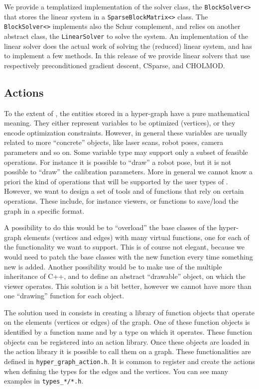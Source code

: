 \documentclass[a4paper]{article}
\begin{document}
We provide a templatized implementation of the solver class, the
\verb+BlockSolver<>+ that stores the linear system in a
\verb+SparseBlockMatrix<>+ class. The \verb+BlockSolver<>+ implements
also the Schur complement, and relies on another abstract class, the
\verb+LinearSolver+ to solve the system.
An implementation of the linear solver does the actual work
of solving the (reduced) linear system, and has to implement a few methods.
In this release of \gopt{} we provide linear solvers that use respectively
preconditioned gradient descent, CSparse, and CHOLMOD.


\subsection{Actions}
To the extent of \gopt{}, the entities stored in a hyper-graph have a
pure mathematical meaning. They either represent variables to be
optimized (vertices), or they encode optimization constraints.
However, in general these variables are usually related to more
``concrete'' objects, like laser scans, robot poses, camera parameters
and so on.  Some variable type may support only a subset of feasible
operations.  For instance it is possible to ``draw'' a robot pose, but
it is not possible to ``draw'' the calibration parameters.  More in
general we cannot know a priori the kind of operations that will be
supported by the user types of \gopt.  However, we want to design a set
of tools and of functions that rely on certain operations. These include,
for instance viewers, or functions to save/load the graph in a specific format.

A possibility to do this would be to ``overload'' the base classes of
the hyper-graph elements (vertices and edges) with many virtual
functions, one for each of the functionality we want to support.  This
is of course not elegant, because we would need to patch the base
classes with the new function every time something new is added.
Another possibility would be to make use of the multiple inheritance
of C++, and to define an abstract ``drawable'' object, on which the
viewer operates.  This solution is a bit better, however we cannot
have more than one ``drawing'' function for each object.

The solution used in \gopt{} consists in creating a library of
function objects that operate on the elements (vertices or edges) of
the graph.  One of these function objects is identified by a function
name and by a type on which it operates.  These function objects can
be registered into an action library.  Once these objects are loaded
in the action library it is possible to call them on a graph.  These
functionalities are defined in \verb+hyper_graph_action.h+.  It is
common to register and create the actions when defining the types for
the edges and the vertices.  You can see many examples in
\verb+types_*/*.h+.
\end{document}
